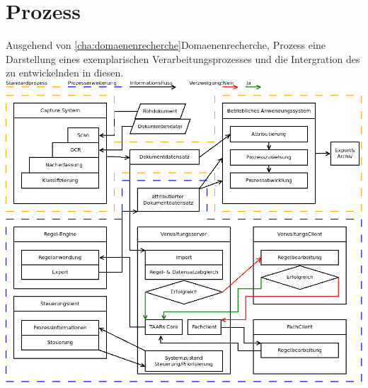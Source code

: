 \chapter{Prozess}
%
%
Ausgehend von \ref{cha:domaenenrecherche}{Domaenenrecherche,  Prozess} eine Darstellung eines exemplarischen Verarbeitungsprozesses und 
die Intergration des zu entwickelnden \brand in diesen.\\

\includegraphics[width=\textwidth]{EISWS1516Howe_Prozess.png}
\noindent